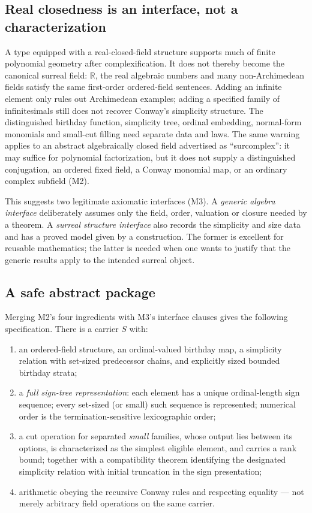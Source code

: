 \documentclass[11pt,letterpaper]{article}
\numberwithin{equation}{section}
\theoremstyle{definition}
\theoremstyle{remark}
\newcommand{\R}{\mathbb R}
\begin{document}
\subsection{Real closedness is an interface, not a characterization}
\label{found:sub:interface}
A type equipped with a real-closed-field structure supports much of finite
polynomial geometry after complexification. It does not thereby become the
canonical surreal field: $\R$, the real algebraic numbers and many
non-Archimedean fields satisfy the same first-order ordered-field sentences.
Adding an infinite element only rules out Archimedean examples; adding a
specified family of infinitesimals still does not recover Conway's simplicity
structure. The distinguished birthday function, simplicity tree, ordinal
embedding, normal-form monomials and small-cut filling need separate data and
laws. The same warning applies to an abstract algebraically closed field
advertised as ``surcomplex'': it may suffice for polynomial factorization, but
it does not supply a distinguished conjugation, an ordered fixed field, a Conway
monomial map, or an ordinary complex subfield (M2).

This suggests two legitimate axiomatic interfaces (M3). A \emph{generic algebra
interface} deliberately assumes only the field, order, valuation or closure
needed by a theorem. A \emph{surreal structure interface} also records the
simplicity and size data and has a proved model given by a construction. The
former is excellent for reusable mathematics; the latter is needed when one
wants to justify that the generic results apply to the intended surreal object.

\subsection{A safe abstract package}
\label{found:sub:package}
Merging M2's four ingredients with M3's interface clauses gives the following
specification. There is a carrier $S$ with:
\begin{enumerate}
\item an ordered-field structure, an ordinal-valued birthday map, a simplicity
relation with set-sized predecessor chains, and explicitly sized bounded
birthday strata;
\item a \emph{full sign-tree representation}: each element has a unique
ordinal-length sign sequence; every set-sized (or small) such sequence is
represented; numerical order is the termination-sensitive lexicographic order;
\item a cut operation for separated \emph{small} families, whose output lies
between its options, is characterized as the simplest eligible element, and
carries a rank bound; together with a compatibility theorem identifying the
designated simplicity relation with initial truncation in the sign
presentation;
\item arithmetic obeying the recursive Conway rules and respecting equality ---
not merely arbitrary field operations on the same carrier.
\end{enumerate}
\end{document}
